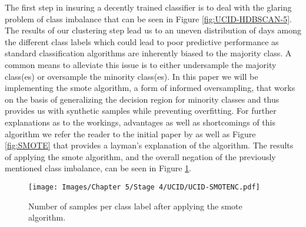 \noindent \newline The first step in insuring a decently trained classifier is to deal with the glaring problem of class imbalance that can be seen in Figure \ref{fig:UCID-HDBSCAN-5}. The results of our clustering step lead us to an uneven distribution of days among the different class labels which could lead to poor predictive performance as standard classification algorithms are inherently biased to the majority class. A common means to alleviate this issue is to either undersample the majority class(es) or oversample the minority class(es). In this paper we will be implementing the \gls{smote} algorithm, a form of informed oversampling, that works on the basis of generalizing the decision region for minority classes and thus provides us with synthetic samples while preventing overfitting. For further explanations as to the workings, advantages as well as shortcomings of this algorithm we refer the reader to the initial paper by \citet{Chawla} as well as Figure \ref{fig:SMOTE} that provides a layman's explanation of the algorithm. The results of applying the \gls{smote} algorithm, and the overall negation of the previously mentioned class imbalance, can be seen in Figure \ref{fig:UCID-SMOTENC}.

\begin{figure}[H]
    \centering
    \texttt{[image: Images/Chapter 5/Stage 4/UCID/UCID-SMOTENC.pdf]}
    \caption{Number of samples per class label after applying the \gls{smote} algorithm.}
    \label{fig:UCID-SMOTENC}
\end{figure}


